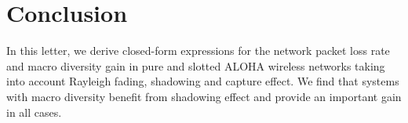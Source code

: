 \section{Conclusion}
\label{sec:conclusion}
In this letter, we derive closed-form expressions for the network packet loss rate and macro diversity gain in pure and slotted ALOHA wireless networks taking into account Rayleigh fading, shadowing and capture effect. We find that systems with macro diversity benefit from shadowing effect and provide an important gain in all cases. 

